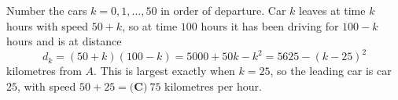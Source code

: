 Number the cars $k=0,1,\dots,50$ in order of departure. Car $k$ leaves at time $k$ hours with speed $50+k$, so at time $100$ hours it has been driving for $100-k$ hours and is at distance
\[d_k=(50+k)(100-k)=5000+50k-k^2=5625-(k-25)^2\]
kilometres from $A$. This is largest exactly when $k=25$, so the leading car is car $25$, with speed $50+25=\boxed{\textbf{(C)}\ 75}$ kilometres per hour.
